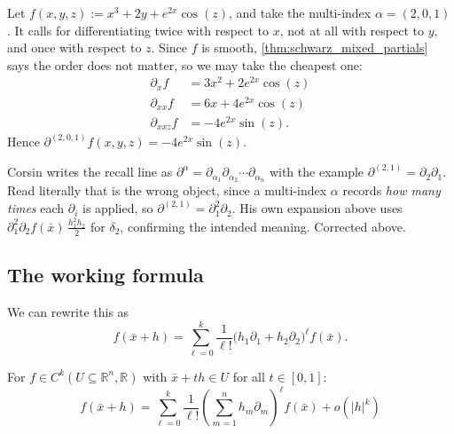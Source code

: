 \begin{example}
\label{ex:multi_index_evaluation}
Let $f(x,y,z) := x^3+2y+e^{2x}\cos(z)$, and take the multi-index $\alpha = (2,0,1)$. It calls for
differentiating twice with respect to $x$, not at all with respect to $y$, and once with respect
to $z$. Since $f$ is smooth, \cref{thm:schwarz_mixed_partials} says the order does not matter, so
we may take the cheapest one:
\begin{align*}
\partial_x f &= 3x^2 + 2e^{2x}\cos(z) \\
\partial_{xx} f &= 6x + 4e^{2x}\cos(z) \\
\partial_{xxz} f &= -4e^{2x}\sin(z).
\end{align*}
Hence $\partial^{(2,0,1)} f(x,y,z) = -4e^{2x}\sin(z)$.
\end{example}

\begin{ainote}
Corsin writes the recall line as
$\partial^\alpha = \partial_{\alpha_1}\partial_{\alpha_2}\cdots\partial_{\alpha_n}$ with the
example $\partial^{(2,1)} = \partial_2\partial_1$. Read literally that is the wrong object, since
a multi-index $\alpha$ records \textit{how many times} each $\partial_i$ is applied, so
$\partial^{(2,1)} = \partial_1^2\partial_2$. His own expansion above uses
$\partial_1^2\partial_2 f(\bar x)\,\tfrac{h_1^2h_2}{2}$ for $\delta_2$, confirming the intended
meaning. Corrected above.
\end{ainote}

\subsection{The working formula}

We can rewrite this as
\[f(\bar x + h) = \sum_{\ell=0}^{k}\frac{1}{\ell!}\big(h_1\partial_1 + h_2\partial_2\big)^\ell f(\bar x).\]

\begin{theorem}
\label{thm:taylor_working_formula}
For $f \in C^k(U \subseteq \mathbb{R}^n, \mathbb{R})$ with $\bar x + th \in U$ for all
$t \in [0,1]$:
\[f(\bar x + h) = \sum_{\ell=0}^{k}\frac{1}{\ell!}\left(\sum_{m=1}^{n} h_m\partial_m\right)^{\!\ell} f(\bar x) + o(|h|^k)\]
\end{theorem}

